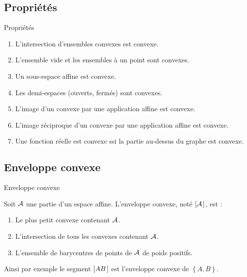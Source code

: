 \documentclass[bigger]{m53beamer}
\begin{document}
\subsection{Propriétés}
\begin{frame}{Propriétés}
  \begin{enumerate}[<+(1)->]
    \item L'intersection d'ensembles convexes est convexe.
    \item L'ensemble vide et les ensembles à un point sont convexes.
    \item Un sous-espace affine est convexe.
    \item Les demi-espaces (ouverts, fermés) sont convexes.
    \item L'image d'un convexe par une application affine est convexe.
    \item L'image réciproque d'un convexe par une application affine est convexe.
    \item Une fonction réelle est convexe ssi la partie au-dessus du graphe est convexe.
  \end{enumerate}
\end{frame}

\subsection{Enveloppe convexe}
\begin{frame}{Enveloppe convexe}
  \begin{defprop}
    Soit $\mathcal{A}$ une partie d'un espace affine. L'enveloppe convexe, noté $[{\mathcal{A}}\kern.14em]$, est :
    \begin{enumerate}[<+(1)->]
      \item Le plus petit convexe contenant $\mathcal{A}$.
      \item L'intersection de tous les convexes contenant $\mathcal{A}$.
      \item L'ensemble de barycentres de points de $\mathcal{A}$ de poids positifs.
    \end{enumerate}
  \end{defprop}\pause
    Ainsi par exemple le segment $[{AB}\kern.14em]$ est l'enveloppe convexe de $\left\{A,B\right\}$.
\end{frame}
\end{document}
